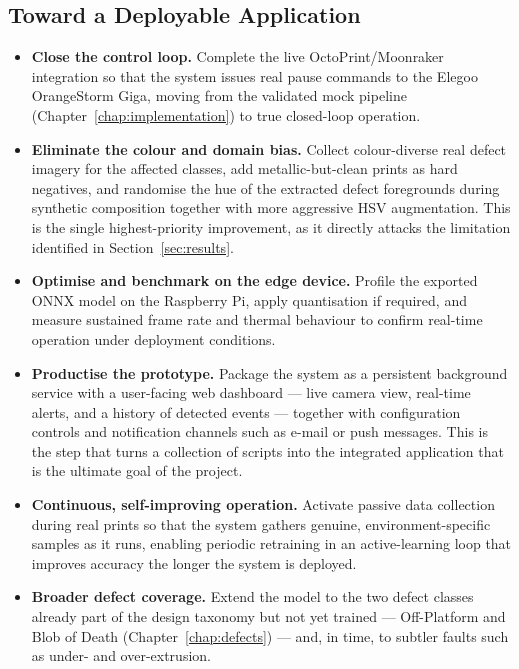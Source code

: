 \documentclass[english, Lau, oneside]{sapthesis}
\begin{document}
\subsection{Toward a Deployable Application}
\begin{itemize}
    \item \textbf{Close the control loop.} Complete the live OctoPrint/Moonraker integration so that the system issues real pause commands to the Elegoo OrangeStorm Giga, moving from the validated mock pipeline (Chapter~\ref{chap:implementation}) to true closed-loop operation.
    \item \textbf{Eliminate the colour and domain bias.} Collect colour-diverse real defect imagery for the affected classes, add metallic-but-clean prints as hard negatives, and randomise the hue of the extracted defect foregrounds during synthetic composition together with more aggressive HSV augmentation. This is the single highest-priority improvement, as it directly attacks the limitation identified in Section~\ref{sec:results}.
    \item \textbf{Optimise and benchmark on the edge device.} Profile the exported ONNX model on the Raspberry Pi, apply quantisation if required, and measure sustained frame rate and thermal behaviour to confirm real-time operation under deployment conditions.
    \item \textbf{Productise the prototype.} Package the system as a persistent background service with a user-facing web dashboard --- live camera view, real-time alerts, and a history of detected events --- together with configuration controls and notification channels such as e-mail or push messages. This is the step that turns a collection of scripts into the integrated application that is the ultimate goal of the project.
    \item \textbf{Continuous, self-improving operation.} Activate passive data collection during real prints so that the system gathers genuine, environment-specific samples as it runs, enabling periodic retraining in an active-learning loop that improves accuracy the longer the system is deployed.
    \item \textbf{Broader defect coverage.} Extend the model to the two defect classes already part of the design taxonomy but not yet trained --- Off-Platform and Blob of Death (Chapter~\ref{chap:defects}) --- and, in time, to subtler faults such as under- and over-extrusion.
\end{itemize}
\end{document}
